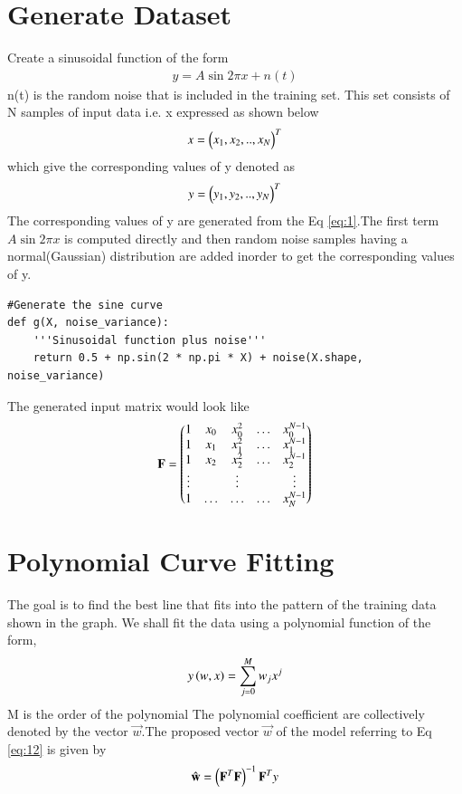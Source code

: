 \documentclass[journal,12pt,twocolumn]{IEEEtran}
\begin{document}
\section{Generate Dataset}
Create a sinusoidal function of the form
\begin{align}
    y = A\sin{2\pi x} + n(t) \label{eq:1}
\end{align}
n(t) is the random noise that is included in the training set. This set consists of N samples of input data i.e. x expressed as shown below
\begin{align}
    x = \begin{pmatrix}x_{1}, x_{2}, .., x_{N}\end{pmatrix}^{T}
\end{align}
which give the corresponding values of y denoted as
\begin{align}
    y = \begin{pmatrix}y_{1}, y_{2}, .., y_{N}\end{pmatrix}^{T}
\end{align}
The corresponding values of y are generated from the Eq \eqref{eq:1}.The first term $A\sin{2\pi x}$ is computed directly and then random noise samples having a normal(Gaussian) distribution are added inorder to get the corresponding values of y.
\begin{lstlisting}
#Generate the sine curve 
def g(X, noise_variance):
    '''Sinusoidal function plus noise'''
    return 0.5 + np.sin(2 * np.pi * X) + noise(X.shape, noise_variance)
\end{lstlisting}
The generated input matrix would look like
\begin{align}
    \mathbf{F}= \begin{pmatrix} 1 & x_{0} & x_{0}^2 & \ldots & x_{0}^{N-1} \\
		1 & x_{1} & x_{1}^2 & \ldots & x_{1}^{N-1} \\
		1 & x_{2} & x_{2}^2 & \ldots & x_{2}^{N-1} \\
		\vdots & & \vdots &  & \vdots  \\
		    1 & \ldots & \ldots & \ldots & x_{N}^{N-1} \end{pmatrix}\label{eq:12}
\end{align}
\section{Polynomial Curve Fitting}
The goal is to find the best line that fits into the  pattern of the training data shown in the graph.
We shall fit the data using a polynomial function of the form, 
\begin{align}
     y\left(w,x\right)= \sum_{j=0}^{M} w_j x^{j}\\
\end{align}
M is the order of the polynomial
The polynomial coefficient are collectively denoted by the vector $\vec{w}$.The proposed vector $\vec{w}$ of the model referring to Eq \eqref{eq:12} is given by 
\begin{align}
    \hat{\mathbf{w}} = \left(\mathbf{F}^T\mathbf{F}\right)^{-1}\mathbf{F}^Ty \label{eq:13}
\end{align}
\end{document}
